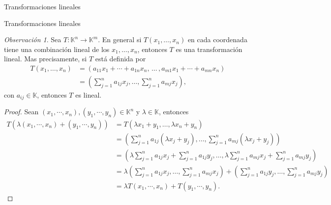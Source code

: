 \documentclass[a4paper,12pt,twoside,spanish,reqno]{amsbook}
\theoremstyle{definition}
\theoremstyle{remark}
\newtheorem{obs}{Observaci\'on}[section]
\newcommand{\K}{\mathbb K}
\begin{document}
\begin{chapter}{Transformaciones lineales}
\begin{section}{Transformaciones lineales}
            \begin{obs}\label{obs-tl-1.5} 	Sea $T: \K^n \to \K^m$. En  general si $T(x_1,\ldots,x_n)$ en cada coordenada tiene una combinación lineal de los $x_1,\ldots,x_n$,  entonces $T$ es una transformación lineal. Mas precisamente, si $T$ está definida por
                \begin{align*}
                T(x_1,\ldots,x_n) &= (a_{11}x_1+\cdots + a_{1n}x_n,\, \ldots\,,a_{m1}x_1+\cdots + a_{mn}x_n )\\
                &=(\sum_{j=1}^n a_{1j} x_j,\ldots,\sum_{j=1}^n a_{mj} x_j),
                \end{align*}
                con $a_{ij} \in \K$, entonces $T$  es lineal. 
            \begin{proof}
                Sean $(x_1,\cdots,x_n), (y_1,\cdots,y_n) \in \K^n$ y $\lambda \in \K$,  entonces
                \begin{align*}
                T(\lambda(x_1,\cdots,x_n)+ (y_1,\cdots,y_n)) &= T(\lambda x_1+y_1,\ldots,\lambda x_n+y_n) \\
                &= (\sum_{j=1}^n a_{1j} (\lambda x_j+y_j),\ldots,\sum_{j=1}^n a_{mj} (\lambda x_j+y_j)) \\
                &= (\lambda\sum_{j=1}^n a_{1j} x_j+\sum_{j=1}^n a_{1j} y_j,\ldots,\lambda\sum_{j=1}^n a_{mj} x_j+\sum_{j=1}^n a_{mj} y_j) \\
                &= \lambda(\sum_{j=1}^n a_{1j} x_j,\ldots,\sum_{j=1}^n a_{mj} x_j) +(\sum_{j=1}^n a_{1j} y_j,\ldots,\sum_{j=1}^n a_{mj} y_j) \\
                & =\lambda T(x_1,\cdots,x_n)+ T(y_1,\cdots,y_n).
                \end{align*}
            \end{proof}
            \end{obs}
            

\end{section}
\end{chapter}
\end{document}
